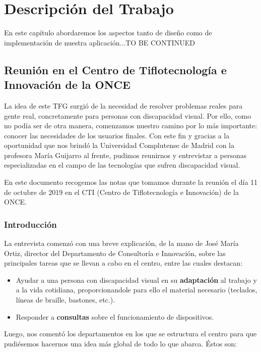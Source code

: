 \chapter{Descripción del Trabajo}
\label{cap:descripcionTrabajo}

En este capítulo abordaremos los aspectos tanto de diseño como de implementación de nuestra aplicación...TO BE CONTINUED

\section{Reunión en el Centro de Tiflotecnología e Innovación de la ONCE}

La idea de este TFG surgió de la necesidad de resolver problemas reales para gente real, concretamente para personas con discapacidad visual. Por ello, como no podía ser de otra manera, comenzamos nuestro camino por lo más importante: conocer las necesidades de los usuarios finales. Con este fin y gracias a la oportunidad que nos  brindó la Universidad Complutense de Madrid con la profesora María Guijarro al frente, pudimos reunirnos y entrevistar a personas especializadas en el campo de las tecnologías que sufren discapacidad visual.

En este documento recogemos las notas que tomamos durante la reunión el día 11 de octubre de 2019 en el CTI (Centro de Tiflotecnología e Innovación) de la ONCE.
	

\subsection{Introducción}
La entrevista comenzó con una breve explicación, de la mano de José María Ortiz, director del Departamento de Consultoría e Innovación, sobre las principales tareas que se llevan a cabo en el centro, entre las cuales destacan:

\begin{itemize}
	\item Ayudar a una persona con discapacidad visual en su \textbf{adaptación} al trabajo y a la vida cotidiana, proporcionandole para ello el material necesario (teclados, líneas de braille, bastones, etc.).
	\item Responder a \textbf{consultas} sobre el funcionamiento de dispositivos.
\end{itemize}

Luego, nos comentó los departamentos en los que se estructura el centro para que pudiésemos hacernos una idea más global de todo lo que abarca. Éstos son:

